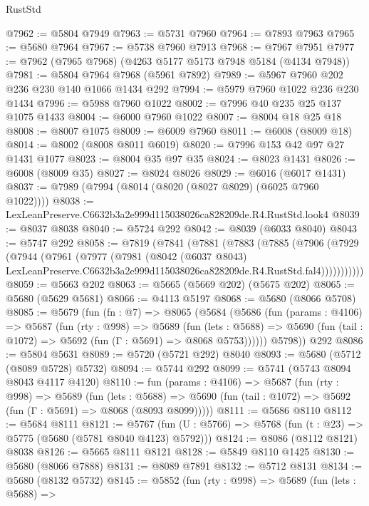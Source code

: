 \begin{lexlean}{RustStd}
\begin{coremodule}
@7962 := @5804 @7949
@7963 := @5731 @7960
@7964 := @7893 @7963
@7965 := @5680 @7964
@7967 := @5738 @7960 @7913
@7968 := @7967 @7951
@7977 := @7962 (@7965 @7968) (@4263 @5177 @5173 @7948 @5184 (@4134 @7948))
@7981 := @5804 @7964 @7968 (@5961 @7892)
@7989 := @5967 @7960 @202 @236 @230 @140 @1066 @1434 @292
@7994 := @5979 @7960 @1022 @236 @230 @1434
@7996 := @5988 @7960 @1022
@8002 := @7996 @40 @235 @25 @137 @1075 @1433
@8004 := @6000 @7960 @1022
@8007 := @8004 @18 @25 @18
@8008 := @8007 @1075
@8009 := @6009 @7960
@8011 := @6008 (@8009 @18)
@8014 := @8002 (@8008 @8011 @6019)
@8020 := @7996 @153 @42 @97 @27 @1431 @1077
@8023 := @8004 @35 @97 @35
@8024 := @8023 @1431
@8026 := @6008 (@8009 @35)
@8027 := @8024 @8026
@8029 := @6016 (@6017 @1431)
@8037 := @7989 (@7994 (@8014 (@8020 (@8027 @8029) (@6025 @7960 @1022))))
@8038 := LexLeanPreserve.C6632b3a2e999d115038026ca828209de.R4.RustStd.look4
@8039 := @8037 @8038
@8040 := @5724 @292
@8042 := @8039 (@6033 @8040)
@8043 := @5747 @292
@8058 := @7819
    (@7841
      (@7881
        (@7883
          (@7885
            (@7906
              (@7929
                (@7944
                  (@7961
                    (@7977
                      (@7981
                        (@8042
                          (@6037 @8043)
                          LexLeanPreserve.C6632b3a2e999d115038026ca828209de.R4.RustStd.fal4)))))))))))
@8059 := @5663 @202
@8063 := @5665 (@5669 @202) (@5675 @202)
@8065 := @5680 (@5629 @5681)
@8066 := @4113 @5197
@8068 := @5680 (@8066 @5708)
@8085 := @5679
    (fun (fn : @7) =>
    @8065
      (@5684
        (@5686
          (fun (params : @4106) =>
          @5687
            (fun (rty : @998) =>
            @5689
              (fun (lets : @5688) =>
              @5690 (fun (tail : @1072) => @5692 (fun (Γ : @5691) => @8068 @5753))))))
        @5798))
    @292
@8086 := @5804 @5631
@8089 := @5720 (@5721 @292) @8040
@8093 := @5680 (@5712 (@8089 @5728) @5732)
@8094 := @5744 @292
@8099 := @5741 (@5743 @8094 @8043 @4117 @4120)
@8110 := fun (params : @4106) =>
  @5687
    (fun (rty : @998) =>
    @5689
      (fun (lets : @5688) =>
      @5690 (fun (tail : @1072) => @5692 (fun (Γ : @5691) => @8068 (@8093 @8099)))))
@8111 := @5686 @8110
@8112 := @5684 @8111
@8121 := @5767 (fun (U : @5766) => @5768 (fun (t : @23) => @5775 (@5680 (@5781 @8040 @4123) @5792)))
@8124 := @8086 (@8112 @8121) @8038
@8126 := @5665 @8111 @8121
@8128 := @5849 @8110 @1425
@8130 := @5680 (@8066 @7888)
@8131 := @8089 @7891
@8132 := @5712 @8131
@8134 := @5680 (@8132 @5732)
@8145 := @5852
    (fun (rty : @998) =>
    @5689
      (fun (lets : @5688) =>

\end{coremodule}
\end{lexlean}
